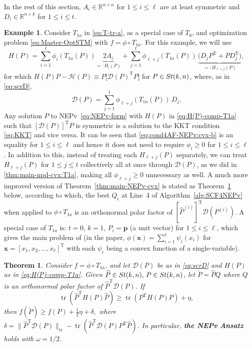 \documentclass[11pt]{article}
\def\bp{\pmb{p}}
\def\bx{\pmb{x}}
\def\bbR{\mathbb{R}}
\def\scrD{\mathscr{D}}
\def\scrH{\mathscr{H}}
\def\wtd{\widetilde}
\def\what{\widehat}
\newcommand\STM[2]{{\rm St}(#1,#2)}
\DeclareMathOperator{\tr}{tr}
\DeclareMathOperator{\T}{T}
\newtheorem{theorem}{Theorem}[section]
\theoremstyle{definition}
\newtheorem{example}{Example}[section]
\numberwithin{equation}{section}
\begin{document}
In the rest of this section,
$A_i\in\bbR^{n\times n}$ for $1\le i\le\ell$ are at least symmetric
and $D_i\in\bbR^{n\times k}$ for $1\le i\le t$.

\begin{example}\label{eg:T1a-NEPv}
Consider $T_{1a}$  in \eqref{eq:T-tr-a}, as a special case of $T_0$, and optimization problem \eqref{eq:Master-OptSTM} with
$f=\phi\circ T_{1a}$. For this example, we will use
\begin{equation}\label{eq:H(P)-comp-T1a}
H(P)=\sum_{i=1}^{\ell}\phi_i(T_{1a}(P))\underbrace{2A_i}_{=:H_i(P)}
     +\sum_{j=1}^{t} \phi_{\ell+j}(T_{1a}(P))\, \underbrace{\big(D_jP^{\T}+PD_j^{\T}\big)}_{=:H_{\ell+j}(P)},
\end{equation}
for which $H(P)P-\scrH(P)\equiv P\big[\scrD(P)^{\T}P\big]$ for $P\in\STM{k}{n}$, where, as in \eqref{eq:scrD},
$$
\scrD(P)=\sum_{j=1}^{t}\phi_{\ell+j}(T_{1a}(P))\, D_j.
$$
Any solution $P$ to NEPv~\eqref{eq:NEPv-form} with
$H(P)$ in \eqref{eq:H(P)-comp-T1a} such that $[\scrD(P)]^{\T}P$ is symmetric is a solution to the KKT condition \eqref{eq:KKT}
and vice versa.
It can be seen that \eqref{eq:cond4AF-NEPv:cvx-b} is an equality for $1\le i\le\ell$ and hence
it does not need to require $\phi_i\ge 0$ for $1\le i\le\ell$. In addition to this, instead of treating each
$H_{\ell+j}(P)$ separately, we can treat $H_{\ell+j}(P)$ for $1\le j\le t$ collectively all at once
through $\scrD(P)$, as
we did in \eqref{thm:main-npd-cvx:T1a}, making all $\phi_{\ell+j}\ge 0$ unnecessary as well. A much more improved
version of Theorem~\ref{thm:main-NEPv-cvx}
is stated as Theorem~\ref{thm:main-NEPv-cvx:T1a} below,
according to which, the best $Q_i$ at Line~4 of Algorithm~\ref{alg:SCF4NEPv}
when applied to $\phi\circ T_{1a}$
is an orthonormal polar factor of $[\what P^{(i)}]^{\T}\scrD(P^{(i)})$.
A special case of $T_{1a}$ is: $t=0$, $k=1$, $P_i=\bp$ (a unit vector) for $1\le i\le\ell$, which gives the main problem of \cite{balu:2024}
  (in the paper, $\phi(\bx)=\sum_{i=1}^{\ell}\psi_i(x_i)$
for $\bx=[x_1,x_2,\ldots,x_{\ell}]^{\T}$ with each $\psi_i$ being a convex function of a single-variable).
\end{example}

\begin{theorem}\label{thm:main-NEPv-cvx:T1a}
Consider $f=\phi\circ T_{1a}$, and let $\scrD(P)$ be as in \eqref{eq:scrD}
and $H(P)$ as in \eqref{eq:H(P)-comp-T1a}.
Given $\what P\in\STM{k}{n},\,P\in\STM{k}{n}$, let $\wtd P=\what PQ$ where
$Q$ is an orthonormal polar factor of $\what P^{\T}\scrD(P)$.
If
$$
\tr(\what P^{\T}H(P)\what P)\ge\tr(P^{\T}H(P)P)+\eta,
$$
then
$
f(\wtd P)\ge f(P)+\frac 12\eta+\delta,
$
where $\delta=\|\what P^{\T}\scrD(P)\|_{\tr}-\tr(\what P^{\T}\scrD(P)P^{\T}\what P)$.
In particular, {\bf the NEPv Ansatz} holds  with $\omega=1/2$.
\end{theorem}
\end{document}
